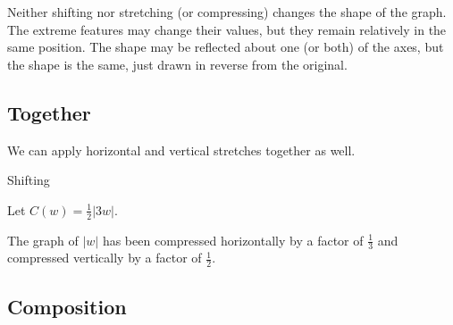 \documentclass{ximera}
\begin{document}
Neither shifting nor stretching (or compressing) changes the shape of the graph.  The extreme features may change their values, but they remain relatively in the same position.  The shape may be reflected about one (or both) of the axes, but the shape is the same, just drawn in reverse from the original.





\subsection*{Together}

We can apply horizontal and vertical stretches together as well.





\begin{example}  Shifting

Let $C(w) = \frac{1}{2}|3w|$.


\begin{image}
\end{image}

\end{example}

The graph of $|w|$ has been compressed horizontally by a factor of $\frac{1}{3}$ and compressed vertically by a factor of $\frac{1}{2}$.





\subsection*{Composition}
\end{document}
